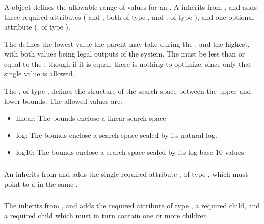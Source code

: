 \begin{blockChanged}
\subsubsection{}
\label{class:bounds}

A \Bounds object defines the allowable range of values for an \AdjustableParameter.  A \Bounds inherits from \SedBase, and adds three required attributes ( and , both of type , and , of type \ScaleType), and one optional attribute (, of type ).

The  defines the lowest value the parent \AdjustableParameter may take during the \ParameterEstimationTask, and  the highest, with both values being legal outputs of the system.  The  must be less than or equal to the , though if it is equal, there is nothing to optimize, since only that single value is allowed.

The , of type \ScaleType, defines the structure of the search space between the upper and lower bounds.  The allowed values are:

\begin{itemize}
\item linear:  The bounds enclose a linear search space
\item log:  The bounds enclose a search space scaled by its natural log.
\item log10:  The bounds enclose a search space scaled by its log base-10 values.
\end{itemize}


\subsubsection{}
\label{class:experimentRef}

An \ExperimentRef inherits from \SedBase and adds the single required attribute , of type \SIdRef, which must point to a \FitExperiment in the same \ParameterEstimationTask.  


\subsubsection{}
\label{class:fitExperiment}
\label{class:listOfFitMappings}

The \FitExperiment inherits from \SedBase, and adds the required attribute  of type \ExperimentType, a required \Algorithm child, and a required \ListOfFitMappings child which must in turn contain one or more \FitMapping children.


\end{blockChanged}
